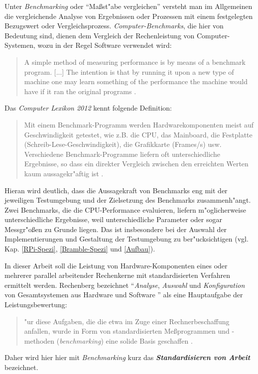Unter \textit{Benchmarking} oder "`Ma\ss st"abe vergleichen"' versteht man im Allgemeinen die vergleichende Analyse von Ergebnissen oder Prozessen mit einem festgelegten Bezugswert oder Vergleichsprozess. \textit{Computer-Benchmarks}, die hier von Bedeutung sind, dienen dem Vergleich der Rechenleistung von Computer-Systemen, wozu in der Regel Software verwendet wird:
\begin{quote}
\onehalfspacing
A simple method of measuring performance is by means of a benchmark program. [...] The intention is that by running it upon a new type of machine one may learn something of the performance the machine would have if it ran the original programs \cite{cur76}.
\end{quote}
Das \textit{Computer Lexikon 2012} kennt folgende Definition: 
\begin{quote}
\onehalfspacing
Mit einem Benchmark-Programm werden Hardwarekomponenten meist auf Geschwindigkeit getestet, wie z.B. die CPU, das Mainboard, die Festplatte (Schreib-Lese-Geschwindigkeit), die Grafikkarte (Frames/s) usw. Verschiedene Benchmark-Programme liefern oft unterschiedliche Ergebnisse, so dass ein direkter Vergleich zwischen den erreichten Werten kaum aussagekr"aftig ist \cite{pre11}. 
\end{quote}
Hieran wird deutlich, dass die Aussagekraft von Benchmarks eng mit der jeweiligen Testumgebung und der Zielsetzung des Benchmarks zusammenh"angt. Zwei Benchmarks, die die CPU-Performance evaluieren, liefern m"oglicherweise unterschiedliche Ergebnisse, weil unterschiedliche Parameter oder sogar Messgr"o\ss en zu Grunde liegen. Das ist insbesondere bei der Auswahl der Implementierungen und Gestaltung der Testumgebung zu ber"ucksichtigen (vgl. Kap. \ref{RPi-Spezi}, \ref{Bramble-Spezi} und \ref{Aufbau}). 

In dieser Arbeit soll die Leistung von Hardware-Komponenten eines oder mehrerer parallel arbeitender Rechenkerne mit standardisierten Verfahren ermittelt werden. Rechenberg bezeichnet "`\textit{Analyse}, \textit{Auswahl} und \textit{Konfiguration} von Gesamtsystemen aus Hardware und Software \cite{rec06}"' als eine Hauptaufgabe der Leistungsbewertung: 
\begin{quote}
\onehalfspacing
[F]"ur diese Aufgaben, die die etwa im Zuge einer Rechnerbeschaffung anfallen, wurde in Form von standardisierten Me\ss programmen und -methoden (\textit{benchmarking}) eine solide Basis geschaffen \cite{rec06}. 
\end{quote} 
Daher wird hier hier mit \textit{Benchmarking} kurz das \textbf{\textit{Standardisieren von Arbeit}} bezeichnet.

